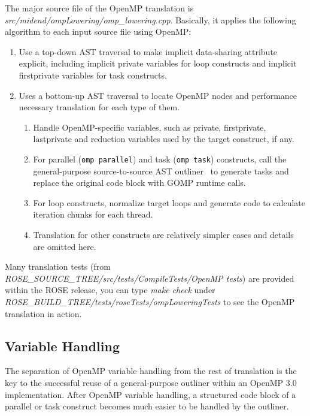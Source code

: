 The major source file of the OpenMP translation is \textit{src/midend/ompLowering/omp\_lowering.cpp}. 
Basically, it applies the following algorithm to each input source file using OpenMP:
\begin{enumerate}
\item  Use a top-down AST traversal to make implicit data-sharing attribute explicit, including implicit private variables for loop constructs and implicit firstprivate variables for task constructs. 
\item  Uses a bottom-up AST traversal to locate OpenMP nodes and performance necessary translation for each type of them.
\begin{enumerate}
\item Handle OpenMP-specific variables, such as private, firstprivate, lastprivate and reduction variables used by the target construct, if any.
\item For parallel (\lstinline{omp parallel}) and task (\lstinline{omp task}) constructs, call the general-purpose source-to-source AST outliner~\cite{LiaoEffective2009} to generate tasks and replace the original code block with GOMP runtime calls.
\item For loop constructs, normalize target loops and generate code to
calculate iteration chunks for each thread.
\item Translation for other constructs are relatively simpler cases and
details are omitted here.
\end{enumerate}
\end{enumerate}

Many translation tests (from
\textit{ROSE\_SOURCE\_TREE/src/tests/CompileTests/OpenMP tests}) are
provided within the ROSE release, you can type
\textit{make check} under
\textit{ROSE\_BUILD\_TREE/tests/roseTests/ompLoweringTests} to see the
OpenMP translation in action.

\subsection{Variable Handling}
The separation of OpenMP variable handling from the rest of translation is
the key to the successful reuse of a general-purpose outliner within an OpenMP 3.0 implementation. 
After OpenMP variable handling, a structured code block of a parallel or task construct becomes much easier to be handled by the outliner.

